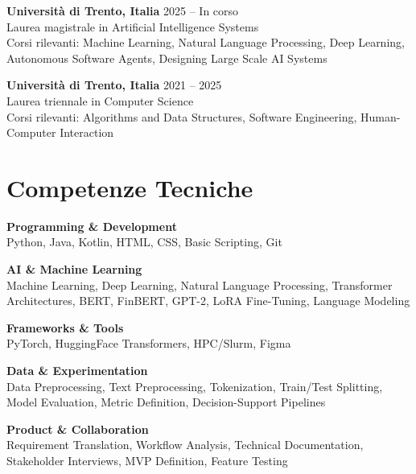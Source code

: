 \documentclass[11pt]{article}
\begin{document}
\textbf{Università di Trento, Italia} \hfill {\color{textgray}2025 -- In corso} \\[-1pt]
Laurea magistrale in Artificial Intelligence Systems \\[4pt]
{\color{textgray}Corsi rilevanti: Machine Learning, Natural Language Processing, Deep Learning, Autonomous Software Agents, Designing Large Scale AI Systems}

\vspace{8pt}

\textbf{Università di Trento, Italia} \hfill {\color{textgray}2021 -- 2025} \\[-1pt]
Laurea triennale in Computer Science \\[4pt]
{\color{textgray}Corsi rilevanti: Algorithms and Data Structures, Software Engineering, Human-Computer Interaction}


\section*{Competenze Tecniche}

\textbf{Programming \& Development} \\
{\color{textgray}Python, Java, Kotlin, HTML, CSS, Basic Scripting, Git}

\vspace{4pt}

\textbf{AI \& Machine Learning} \\
{\color{textgray}Machine Learning, Deep Learning, Natural Language Processing, Transformer Architectures, BERT, FinBERT, GPT-2, LoRA Fine-Tuning, Language Modeling}

\vspace{4pt}

\textbf{Frameworks \& Tools} \\
{\color{textgray}PyTorch, HuggingFace Transformers, HPC/Slurm, Figma}

\vspace{4pt}

\textbf{Data \& Experimentation} \\
{\color{textgray}Data Preprocessing, Text Preprocessing, Tokenization, Train/Test Splitting, Model Evaluation, Metric Definition, Decision-Support Pipelines}

\vspace{4pt}

\textbf{Product \& Collaboration} \\
{\color{textgray}Requirement Translation, Workflow Analysis, Technical Documentation, Stakeholder Interviews, MVP Definition, Feature Testing}
\end{document}
